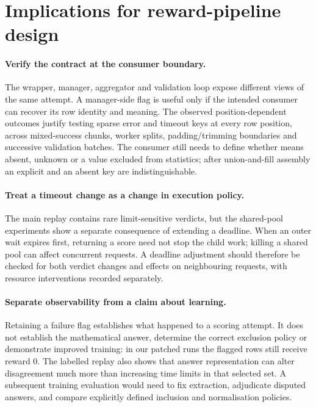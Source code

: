 \documentclass[11pt,a4paper]{article}
\begin{document}
\section{Implications for reward-pipeline design}
\paragraph{Verify the contract at the consumer boundary.} The wrapper, manager, aggregator and validation loop expose different views of the same attempt. A manager-side flag is useful only if the intended consumer can recover its row identity and meaning. The observed position-dependent outcomes justify testing sparse error and timeout keys at every row position, across mixed-success chunks, worker splits, padding/trimming boundaries and successive validation batches. The consumer still needs to define whether  means absent, unknown or a value excluded from statistics; after union-and-fill assembly an explicit  and an absent key are indistinguishable.

\paragraph{Treat a timeout change as a change in execution policy.} The main replay contains rare limit-sensitive verdicts, but the shared-pool experiments show a separate consequence of extending a deadline. When an outer wait expires first, returning a score need not stop the child work; killing a shared pool can affect concurrent requests. A deadline adjustment should therefore be checked for both verdict changes and effects on neighbouring requests, with resource interventions recorded separately.

\paragraph{Separate observability from a claim about learning.} Retaining a failure flag establishes what happened to a scoring attempt. It does not establish the mathematical answer, determine the correct exclusion policy or demonstrate improved training: in our patched runs the flagged rows still receive reward 0. The labelled replay also shows that answer representation can alter disagreement much more than increasing time limits in that selected set. A subsequent training evaluation would need to fix extraction, adjudicate disputed answers, and compare explicitly defined inclusion and normalisation policies.
\end{document}
